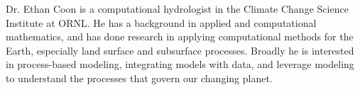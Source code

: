 \documentclass[a4paper,fleqn]{cas-dc}
\begin{document}
\printcredits






Dr. Ethan Coon is a computational hydrologist in the Climate Change Science Institute at ORNL.
He has a background in applied and computational mathematics, and has done research in applying computational methods for the Earth, especially land surface and subsurface processes.
Broadly he is interested in process-based modeling, integrating models with data, and leverage modeling to understand the processes that govern our changing planet.
\endbio
\end{document}
